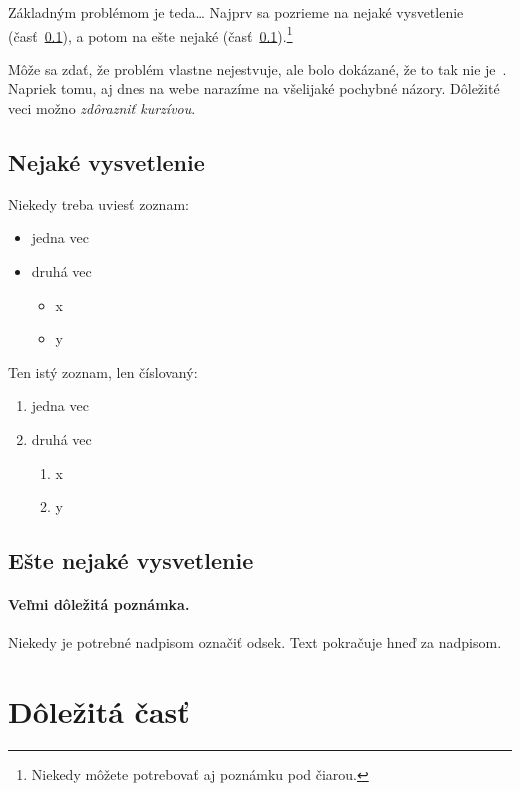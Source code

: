 \documentclass[10pt,twocolumn,twoside,slovak,a4paper]{article}
\begin{document}
Základným problémom je teda\ldots{} Najprv sa pozrieme na nejaké vysvetlenie (časť~\ref{ina:nejake}), a potom na ešte nejaké (časť~\ref{ina:nejake}).\footnote{Niekedy môžete potrebovať aj poznámku pod čiarou.}

Môže sa zdať, že problém vlastne nejestvuje\cite{Coplien:MPD}, ale bolo dokázané, že to tak nie je~\cite{Czarnecki:Staged, Czarnecki:Progress}. Napriek tomu, aj dnes na webe narazíme na všelijaké pochybné názory\cite{PLP-Framework}. Dôležité veci možno \emph{zdôrazniť kurzívou}.


\subsection{Nejaké vysvetlenie} \label{ina:nejake}

Niekedy treba uviesť zoznam:

\begin{itemize}
\item jedna vec
\item druhá vec
	\begin{itemize}
	\item x
	\item y
	\end{itemize}
\end{itemize}

Ten istý zoznam, len číslovaný:

\begin{enumerate}
\item jedna vec
\item druhá vec
	\begin{enumerate}
	\item x
	\item y
	\end{enumerate}
\end{enumerate}


\subsection{Ešte nejaké vysvetlenie} \label{ina:este}

\paragraph{Veľmi dôležitá poznámka.}
Niekedy je potrebné nadpisom označiť odsek. Text pokračuje hneď za nadpisom.



\section{Dôležitá časť} \label{dolezita}
\end{document}
